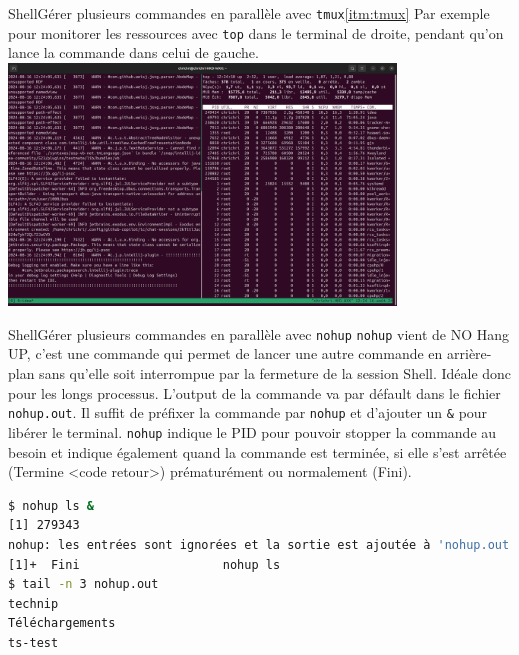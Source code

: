 \documentclass{beamer}
\begin{document}
    \begin{frame}{Shell}{Gérer plusieurs commandes en parallèle avec \lstinline{tmux}\cref{itm:tmux}}
        Par exemple pour monitorer les ressources avec \lstinline{top} dans le terminal de droite, pendant qu'on lance la commande dans celui de gauche.
        \bigbreak
        \centering
        \includegraphics[width=10.3cm]{image/tmux-illustration}
    \end{frame}

    \begin{frame}[fragile]{Shell}{Gérer plusieurs commandes en parallèle avec \lstinline{nohup}}
        \lstinline{nohup} vient de NO Hang UP, c'est une commande qui permet de lancer une autre commande en arrière-plan sans qu'elle soit interrompue par la fermeture de la session Shell.
        Idéale donc pour les longs processus.
        L'output de la commande va par défault dans le fichier \lstinline{nohup.out}.
        \bigbreak
        Il suffit de préfixer la commande par \lstinline{nohup} et d'ajouter un \lstinline{&} pour libérer le terminal.
        \lstinline{nohup} indique le PID pour pouvoir stopper la commande au besoin et indique également quand la commande est terminée, si elle s'est arrêtée (Termine <code retour>) prématurément ou normalement (Fini).
        \begin{lstlisting}[language=bash]
$ nohup ls &
[1] 279343
nohup: les entrées sont ignorées et la sortie est ajoutée à 'nohup.out'
[1]+  Fini                    nohup ls
$ tail -n 3 nohup.out
technip
Téléchargements
ts-test
        \end{lstlisting}
    \end{frame}
\end{document}
